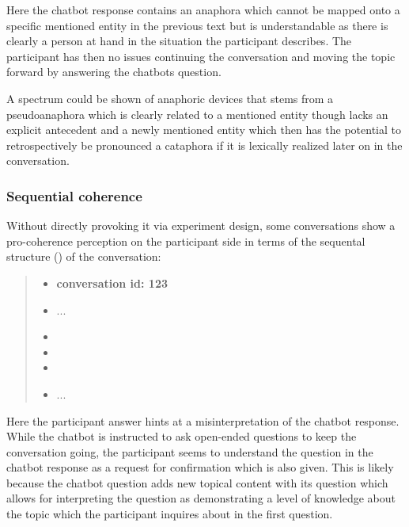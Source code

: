    Here the chatbot response contains an anaphora which
    cannot be mapped onto a specific mentioned entity in the previous text
    but is understandable as there is clearly a person at hand in the situation the participant describes.
    The participant has then no issues continuing the conversation and
    moving the topic forward by answering the chatbots question.

    A spectrum could be shown of anaphoric devices
    that stems from a pseudoanaphora which is clearly related to a mentioned entity
    though lacks an explicit antecedent and
    a newly mentioned entity which then has the potential to retrospectively be pronounced a cataphora
    if it is lexically realized later on in the conversation.

\subsubsection{Sequential coherence}

Without directly provoking it via experiment design,
some conversations show a pro-coherence perception on the participant side
in terms of the sequental structure () of the conversation:

    \begin{quote}
    \begin{itemize}[label={}, leftmargin=0pt, itemsep=0.5em]
    \item \textbf{conversation id: 123}
    \item ...
    \item {}
    \item {}
    \item {}
    \item ...
    \end{itemize}
    \end{quote}

Here the participant answer hints at a misinterpretation of the chatbot response.
While the chatbot is instructed to ask open-ended questions to keep the conversation going,
the participant seems to understand the question in the chatbot response
as a request for confirmation which is also given.
This is likely because the chatbot question adds new topical content with its question
which allows for interpreting the question as demonstrating a level of knowledge about the topic
which the participant inquires about in the first question.

